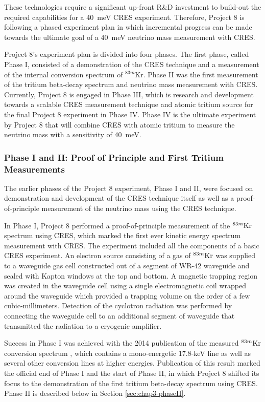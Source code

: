 These technologies require a significant up-front R\&D investment to build-out the required capabilities for a 40~meV CRES experiment. Therefore, Project 8 is following a phased experiment plan in which incremental progress can be made towards the ultimate goal of a 40~meV neutrino mass measurement with CRES.

Project 8's experiment plan is divided into four phases. The first phase, called Phase I, consisted of a demonstration of the CRES technique and a measurement of the internal conversion spectrum of $^{83m}$Kr. Phase II was the first measurement of the tritium beta-decay spectrum and neutrino mass measurement with CRES. Currently, Project 8 is engaged in Phase III, which is research and development towards a scalable CRES measurement technique and atomic tritium source for the final Project 8 experiment in Phase IV. Phase IV is the ultimate experiment by Project 8 that will combine CRES with atomic tritium to measure the neutrino mass with a sensitivity of 40~meV. 

\subsubsection*{Phase I and II: Proof of Principle and First Tritium Measurements}

The earlier phases of the Project 8 experiment, Phase I and II, were focused on demonstration and development of the CRES technique itself as well as a proof-of-principle measurement of the neutrino mass using the CRES technique.

In Phase I, Project 8 performed a proof-of-principle measurement of the $^{83m}\rm{Kr}$ spectrum using CRES, which marked the first ever kinetic energy spectrum measurement with CRES. The experiment included all the components of a basic CRES experiment. An electron source consisting of a gas of $^{83m}\rm{Kr}$ was supplied to a waveguide gas cell constructed out of a segment of WR-42 waveguide and sealed with Kapton windows at the top and bottom. A magnetic trapping region was created in the waveguide cell using a single electromagnetic coil wrapped around the waveguide which provided a trapping volume on the order of a few cubic-millimeters. Detection of the cyclotron radiation was performed by connecting the waveguide cell to an additional segment of waveguide that transmitted the radiation to a cryogenic amplifier.

Success in Phase I was achieved with the 2014 publication of the measured $^{83m}\rm{Kr}$ conversion spectrum \cite{Project8:2014ivu}, which contains a mono-energetic 17.8-keV line as well as several other conversion lines at higher energies. Publication of this result marked the official end of Phase I and the start of Phase II, in which Project 8 shifted its focus to the demonstration of the first tritium beta-decay spectrum using CRES.%
Phase II is described below in Section \ref{sec:chap3-phaseII}.

